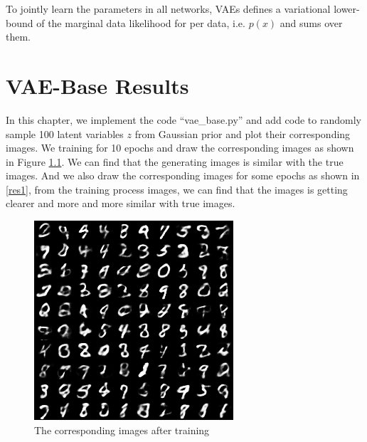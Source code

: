 \documentclass{elegantbook}
\begin{document}
To jointly learn the parameters in all networks, VAEs defines a variational lower-bound of the marginal data
likelihood for per data, i.e. $p(x)$ and sums over them.

\chapter{VAE-Base Results}
In this chapter, we implement the code ``vae\_base.py'' and add code to randomly sample 100 latent variables $z$ from Gaussian prior and plot their corresponding images. We training for 10 epochs and draw the corresponding images as shown in Figure \ref{res2}. We can find that the generating images is similar with the true images. And we also draw the corresponding images for some epochs as shown in \ref{res1}, from the training process images, we can find that the images is getting clearer and more and more similar with true images.
\begin{figure}[!h]
	\centering
	\includegraphics[width=0.8\linewidth]{../results/vae_epoch_10.png}
	\caption{\label{res2}The corresponding images after training}
\end{figure}
\end{document}
